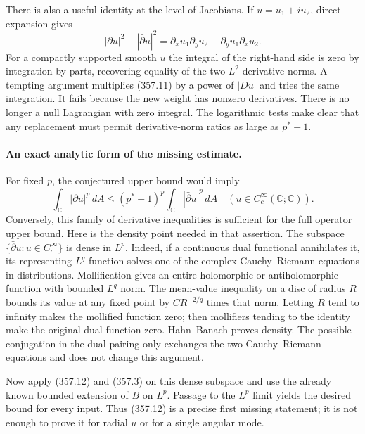 \documentclass[11pt]{article}
\begin{document}
There is also a useful identity at the level of Jacobians. If
$u=u_1+iu_2$, direct expansion gives
\[
 |\partial u|^2-|\bar\partial u|^2
   =\partial_xu_1\partial_yu_2-\partial_yu_1\partial_xu_2.
 \tag{357.11}
\]
For a compactly supported smooth $u$ the integral of the right-hand
side is zero by integration by parts, recovering equality of the two
$L^2$ derivative norms. A tempting argument multiplies (357.11) by
a power of $|Du|$ and tries the same integration. It fails because the
new weight has nonzero derivatives. There is no longer a null
Lagrangian with zero integral. The logarithmic tests make clear that
any replacement must permit derivative-norm ratios as large as
$p^*-1$.

\paragraph{An exact analytic form of the missing estimate.}
For fixed $p$, the conjectured upper bound would imply
\[
 \int_{\mathbb C}|\partial u|^p\,dA
   \leq(p^*-1)^p\int_{\mathbb C}|\bar\partial u|^p\,dA
 \quad(u\in C_c^\infty(\mathbb C;\mathbb C)).
 \tag{357.12}
\]
Conversely, this family of derivative inequalities is sufficient for
the full operator upper bound. Here is the density point needed in
that assertion. The subspace
$\{\bar\partial u:u\in C_c^\infty\}$ is dense in $L^p$.
Indeed, if a continuous dual functional annihilates it, its representing
$L^q$ function solves one of the complex Cauchy--Riemann equations in
distributions. Mollification gives an entire holomorphic or
antiholomorphic function with bounded $L^q$ norm. The mean-value
inequality on a disc of radius $R$ bounds its value at any fixed point
by $C R^{-2/q}$ times that norm. Letting $R$ tend to infinity makes
the mollified function zero; then mollifiers tending to the identity
make the original dual function zero. Hahn--Banach proves density.
The possible conjugation in the dual pairing only exchanges the two
Cauchy--Riemann equations and does not change this argument.

Now apply (357.12) and (357.3) on this dense subspace and use the
already known bounded extension of $B$ on $L^p$. Passage to the
$L^p$ limit yields the desired bound for every input. Thus (357.12)
is a precise first missing statement; it is not enough to prove it
for radial $u$ or for a single angular mode.
\end{document}
